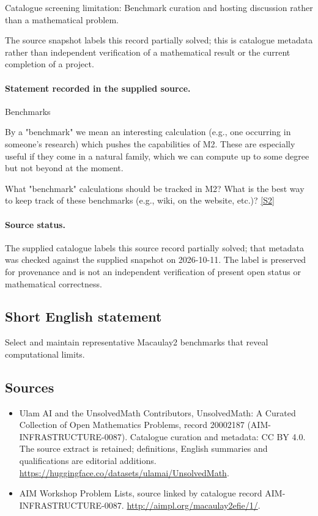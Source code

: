 \documentclass[11pt]{article}
\begin{document}
Catalogue screening limitation: Benchmark curation and hosting discussion rather than a mathematical problem.

The source snapshot labels this record partially solved; this is catalogue metadata rather than independent verification of a mathematical result or the current completion of a project.
\paragraph{Statement recorded in the supplied source.}
Benchmarks

By a "benchmark" we mean an interesting calculation (e.g., one occurring in someone's research) which pushes the capabilities of M2. These are especially useful if they come in a natural family, which we can compute up to some degree but not beyond at the moment.

What "benchmark" calculations should be tracked in M2? What is the best way to keep track of these benchmarks (e.g., wiki, on the website, etc.)? \href{http://aimpl.org/macaulay2efie/1/}{[S2]}
\paragraph{Source status.}
The supplied catalogue labels this source record partially solved; that metadata was checked against the supplied snapshot on 2026-10-11. The label is preserved for provenance and is not an independent verification of present open status or mathematical correctness.
\subsection{Short English statement}
Select and maintain representative Macaulay2 benchmarks that reveal computational limits.
\subsection{Sources}
\begin{itemize}
\item[S1] Ulam AI and the UnsolvedMath Contributors, UnsolvedMath: A Curated Collection of Open Mathematics Problems, record 20002187 (AIM-INFRASTRUCTURE-0087). Catalogue curation and metadata: CC BY 4.0. The source extract is retained; definitions, English summaries and qualifications are editorial additions.
\url{https://huggingface.co/datasets/ulamai/UnsolvedMath}.
\item[S2] AIM Workshop Problem Lists, source linked by catalogue record AIM-INFRASTRUCTURE-0087.
\url{http://aimpl.org/macaulay2efie/1/}.
\end{itemize}
\end{document}

